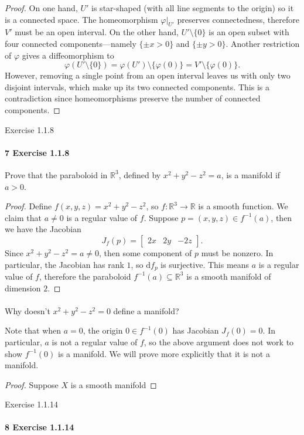 \documentclass[12pt]{article}
\newlength{\myparskip}
\newenvironment{fullbox}{\begin{lrbox}{\savefullbox}\begin{minipage}{\dimexpr\textwidth-2\fboxsep\relax}\setlength{\parskip}{\myparskip}}{\end{minipage}\end{lrbox}\framebox[\textwidth]{\usebox{\savefullbox}}}
\newenvironment{pbox}[1][]{\begin{fullbox}\ifx#1\empty\else\paragraph{#1}\phantom{}\fi}{\end{fullbox}}
\theoremstyle{definition}
\newcommand{\R}{\mathbb{R}}
\renewcommand{\phi}{\varphi}
\newcommand{\<}{\langle}
\renewcommand{\>}{\rangle}
\newcommand{\seq}{\subseteq}
\newcommand{\dd}{\mathrm{d}}
\newcommand{\mat}[1]{\begin{bmatrix}#1\end{bmatrix}}
\begin{document}
\begin{proof}
    On one hand, $U'$ is star-shaped (with all line segments to the origin) so it is a connected space.
    The homeomorphism $\phi|_{U'}$ preserves connectedness, therefore $V'$ must be an open interval.
    On the other hand, $U' \setminus \{0\}$ is an open subset with four connected components---namely $\{\pm x > 0\}$ and $\{\pm y > 0\}$.
    Another restriction of $\phi$ gives a diffeomorphism to
    \[
        \phi(U' \setminus \{0\}) = \phi(U') \setminus \{\phi(0)\} = V' \setminus \{\phi(0)\}.
    \]
    However, removing a single point from an open interval leaves us with only two disjoint intervals, which make up its two connected components.
    This is a contradiction since homeomorphisms preserve the number of connected components.
\end{proof}

\begin{pbox}[7 Exercise 1.1.8]
    Prove that the paraboloid in $\R^3$, defined by $x^2 + y^2 - z^2 = a$, is a manifold if $a > 0$.
\end{pbox}

\begin{proof}
    Define $f(x, y, z) = x^2 + y^2 - z^2$, so $f : \R^3 \to \R$ is a smooth function.
    We claim that $a \ne 0$ is a regular value of $f$.
    Suppose $p = (x, y, z) \in f^{-1}(a)$, then we have the Jacobian
    \[
        J_f(p) = \mat{2x & 2y & -2z}.
    \]
    Since $x^2 + y^2 - z^2 = a \ne 0$, then some component of $p$ must be nonzero.
    In particular, the Jacobian has rank $1$, so $\dd{f}_p$ is surjective.
    This means $a$ is a regular value of $f$, therefore the paraboloid $f^{-1}(a) \seq \R^3$ is a smooth manifold of dimension $2$.
\end{proof}

\begin{pbox}[]
    Why doesn't $x^2 + y^2 - z^2 = 0$ define a manifold?
\end{pbox}

Note that when $a = 0$, the origin $0 \in f^{-1}(0)$ has Jacobian $J_f(0) = 0$.
In particular, $a$ is not a regular value of $f$, so the above argument does not work to show $f^{-1}(0)$ is a manifold.
We will prove more explicitly that it is not a manifold.

\begin{proof}
    Suppose $X$ is a smooth manifold
\end{proof}


\begin{pbox}[8 Exercise 1.1.14]
    
\end{pbox}
\end{document}
